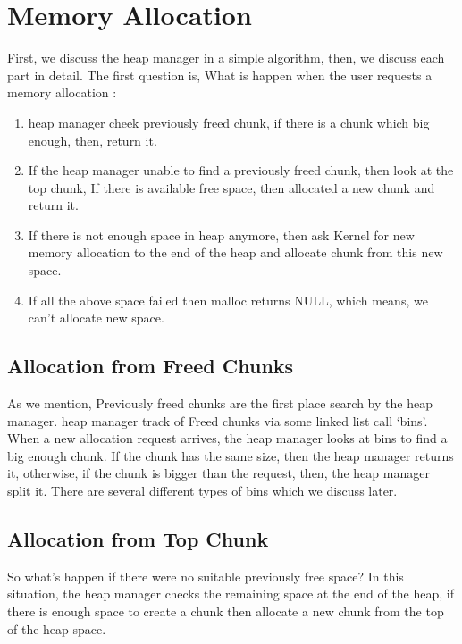 \documentclass{masterthesis}
\begin{document}
\section{Memory Allocation}
 First, we discuss the heap manager in a simple algorithm, then, we discuss each part in detail. The first question is, What is happen when the user requests a memory allocation : 
\begin{enumerate}
	\item heap manager cheek previously freed chunk, if there is a chunk which big enough, then, return it.
	\item If the heap manager unable to find a previously freed chunk, then look at the top chunk, If there is available free space, then allocated a new chunk and return it.
	\item If there is not enough space in heap anymore, then ask Kernel for new memory allocation to the end of the heap and allocate chunk from this new space.
	\item If all the above space failed then malloc returns NULL, which means, we can’t allocate new space.
\end{enumerate}

\subsection{Allocation from Freed Chunks}
As we mention, Previously freed chunks are the first place search by the heap manager. heap manager track of Freed chunks via some linked list call ‘bins’. When a new allocation request arrives, the heap manager looks at bins to find a big enough chunk. If the chunk has the same size, then the heap manager returns it, otherwise, if the chunk is bigger than the request, then, the heap manager split it. There are several different types of bins which we discuss later.

\subsection{Allocation from Top Chunk}
So what’s happen if there were no suitable previously free space? In this situation, the heap manager checks the remaining space at the end of the heap, if there is enough space to create a chunk then allocate a new chunk from the top of the heap space. 
\end{document}
